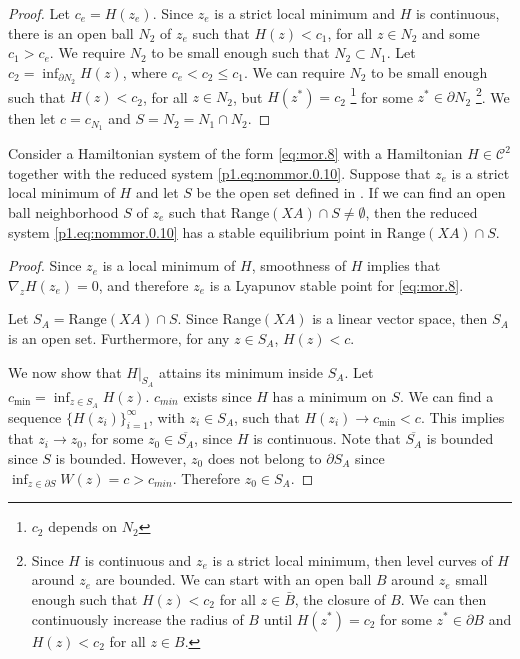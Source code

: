 {{\begin{lemma}
\begin{proof}
Let $c_e = H(z_e)$. Since $z_e$ is a strict local minimum and $H$ is continuous, there is an open ball $N_2$ of $z_e$ such that $H(z)<c_1$, for all $z\in N_2$ and some $c_1>c_e$. We require $N_2$ to be small enough such that $N_2 \subset N_1$. Let $c_2 = \inf_{\partial N_2} H(z)$, where $c_e<c_2\leq c_1$. We can require $N_2$ to be small enough such that $H(z)<c_2$, for all $z\in N_2$, but $H(z^*)=c_2$ \footnote{$c_2$ depends on $N_2$} for some $z^*\in \partial N_2$ \footnote{Since $H$ is continuous and $z_e$ is a strict local minimum, then level curves of $H$ around $z_e$ are bounded. We can start with an open ball $B$ around $z_e$ small enough such that $H(z)<c_2$ for all $z\in \bar{B}$, the closure of $B$. We can then continuously increase the radius of $B$ until $H(z^*) = c_2$ for some $z^*\in \partial B$ and $H(z)<c_2$ for all $z\in B$.}. We then let $c=c_{N_1}$ and $S=N_2=N_1\cap N_2$.
\end{proof}
		
\end{lemma}

\begin{theorem} \label{p1.theorem:SyMo:1}
Consider a Hamiltonian system of the form \eqref{eq:mor.8} with a Hamiltonian $H\in \mathcal C^{2}$  together with the reduced system \eqref{p1.eq:nommor.0.10}. Suppose that $z_e$ is a strict local minimum of $H$ and let $S$ be the open set defined in . If we can find an open ball neighborhood $S$ of $z_e$ such that $\text{Range}(XA)\cap S \neq \emptyset$, then the reduced system \eqref{p1.eq:nommor.0.10} has a stable equilibrium point in $\text{Range}(XA)\cap S$.
\end{theorem}

\begin{proof}
Since $z_e$ is a local minimum of $H$, smoothness of $H$ implies that $\nabla_z H(z_e) = 0$, and therefore $z_e$ is a Lyapunov stable point for \eqref{eq:mor.8}.

Let $S_A = \text{Range}(XA)\cap S$. Since Range$(XA)$ is a linear vector space, then $S_A$ is an open set. Furthermore, for any $z\in S_A$, $H(z) < c$. 
		
We now show that $H|_{S_A}$ attains its minimum inside $S_A$. Let $c_{\text{min}} = \inf_{z\in S_A} H(z)$. $c_{min}$ exists since $H$ has a minimum on $S$. We can find a sequence $\{ H(z_i) \}_{i=1}^\infty$, with $z_i\in S_A$, such that $H(z_i)\to c_{\text{min}} < c$. This implies that $z_i\to z_0$, for some $z_0\in \overline {S_A}$, since $H$ is continuous. Note that $\overline {S_A}$ is bounded since $S$ is bounded. However, $z_0$ does not belong to $\partial S_A$ since $\inf_{z\in \partial S} W(z)=c > c_{min}$. Therefore $z_0 \in S_A$. 


\end{proof}}}
